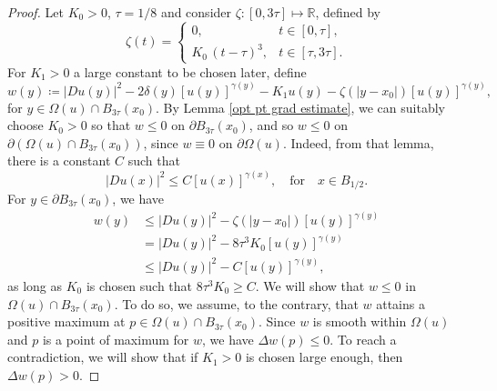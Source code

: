 \documentclass[reqno,11pt]{amsart}
\newcommand{\1}{\mathds{1}}
\numberwithin{equation}{section}
\begin{document}
\begin{proof}
Let $K_0>0$, $\tau = 1/8$ and consider $\zeta \colon [0,3\tau] \mapsto \mathbb{R}$, defined by 
\[
\zeta(t)=
\begin{cases}
  0, & t\in[0,\tau],\\
  K_0\,(t-\tau)^3, & t\in[\tau,3\tau].
\end{cases}
\]
For $K_1>0$ a large constant to be chosen later, define
$$
    w(y) \coloneqq |Du(y)|^2 - 2\delta(y) [u(y)]^{\gamma(y)} - K_1 u(y) - \zeta(|y-x_0|) [u(y)]^{\gamma(y)},
$$
for $y \in \Omega(u) \cap B_{3\tau}(x_0)$. By Lemma \ref{opt pt grad estimate}, we can suitably choose $K_0>0$ so that $w \leq 0$ on $\partial B_{3\tau}(x_0)$, and so $w \leq 0$ on $\partial (\Omega(u) \cap B_{3\tau}(x_0))$, since $w \equiv 0$ on $\partial \Omega(u)$. Indeed, from that lemma, there is a constant $C$ such that
$$
    |Du(x)|^2 \leq C[u(x)]^{\gamma(x)}, \quad \text{for} \quad x \in B_{1/2}.
$$
For $y \in \partial B_{3\tau}(x_0)$, we have
\begin{align*}
    w(y) &\leq |Du(y)|^2 - \zeta(|y-x_0|)[u(y)]^{\gamma(y)}\\
         & = |Du(y)|^2 - 8\tau^3{K_0}[u(y)]^{\gamma(y)}\\
         & \leq |Du(y)|^2 - C[u(y)]^{\gamma(y)},
\end{align*}
as long as $K_0$ is chosen such that $8 \tau^3 K_0 \geq C$. We will show that $w \leq 0$ in $\Omega(u) \cap B_{3\tau}(x_0)$. To do so, we assume, to the contrary, that $w$ attains a positive maximum at $p \in \Omega(u) \cap B_{3\tau}(x_0)$. Since $w$ is smooth within $\Omega(u)$ and $p$ is a point of maximum for $w$, we have $\Delta w(p) \leq 0$. To reach a contradiction, we will show that if $K_1>0$ is chosen large enough, then $\Delta w(p) > 0$.


\end{proof}
\end{document}
